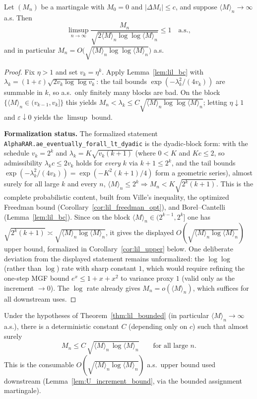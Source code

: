 \begin{theorem}\label{thm:lil_bounded}
Let $(M_n)$ be a martingale with $M_0=0$ and $|\Delta M_i|\le c$, and suppose
$\langle M\rangle_n \to \infty$ a.s. Then
\[
  \limsup_{n\to\infty}
  \frac{M_n}{\sqrt{2\langle M\rangle_n \log\log\langle M\rangle_n}} \le 1
  \quad\text{a.s.},
\]
and in particular $M_n = O\!\big(\sqrt{\langle M\rangle_n \log\log\langle M\rangle_n}\big)$
a.s.
\end{theorem}

\begin{proof}
Fix $\eta>1$ and set $v_k = \eta^k$. Apply Lemma~\ref{lem:lil_bc} with
$\lambda_k=(1+\varepsilon)\sqrt{2v_k\log\log v_k}$: the tail bounds
$\exp(-\lambda_k^2/(4v_k))$ are summable in $k$, so a.s.\ only finitely many blocks are
bad. On the block $\{\langle M\rangle_n\in(v_{k-1},v_k]\}$ this yields
$M_n < \lambda_k \le C\sqrt{\langle M\rangle_n\log\log\langle M\rangle_n}$; letting
$\eta\downarrow1$ and $\varepsilon\downarrow0$ yields the $\limsup$ bound.

\textbf{Formalization status.} The formalized statement
\texttt{AlphaRAR.ae\_eventually\_forall\_lt\_dyadic} is the dyadic-block form: with the schedule
$v_k=2^k$ and $\lambda_k = K\sqrt{v_k(k+1)}$ (where $0<K$ and $Kc\le2$, so admissibility
$\lambda_k c\le 2v_k$ holds for \emph{every} $k$ via $k+1\le 2^k$, and the tail bounds
$\exp(-\lambda_k^2/(4v_k))=\exp(-K^2(k+1)/4)$ form a geometric series), almost surely for all
large $k$ and every $n$, $\langle M\rangle_n\le 2^k \Rightarrow M_n < K\sqrt{2^k(k+1)}$. This is
the complete probabilistic content, built from Ville's inequality, the optimized Freedman bound
(Corollary~\ref{cor:lil_freedman_opt}), and Borel--Cantelli (Lemma~\ref{lem:lil_bc}). Since on the
block $\langle M\rangle_n\in(2^{k-1},2^k]$ one has $\sqrt{2^k(k+1)}\asymp
\sqrt{\langle M\rangle_n\log\langle M\rangle_n}$, it gives the displayed
$O(\sqrt{\langle M\rangle_n\log\langle M\rangle_n})$ upper bound, formalized in
Corollary~\ref{cor:lil_upper} below. One deliberate deviation from the displayed statement remains
unformalized: the $\log\log$ (rather than $\log$) rate with sharp constant $1$, which would require
refining the one-step MGF bound $e^x\le1+x+x^2$ to variance proxy $1$ (valid only as the increment
$\to0$). The $\log$ rate already gives $M_n=o(\langle M\rangle_n)$, which suffices for all
downstream uses.
\end{proof}

\begin{corollary}\label{cor:lil_upper}
Under the hypotheses of Theorem~\ref{thm:lil_bounded} (in particular $\langle M\rangle_n\to\infty$
a.s.), there is a deterministic constant $C$ (depending only on $c$) such that almost surely
\[
  M_n \le C\,\sqrt{\langle M\rangle_n\,\log\langle M\rangle_n}\qquad\text{for all large }n.
\]
This is the consumable $O(\sqrt{\langle M\rangle_n\log\langle M\rangle_n})$ a.s.\ upper bound used
downstream (Lemma~\ref{lem:U_increment_bound}, via the bounded assignment martingale).
\end{corollary}

